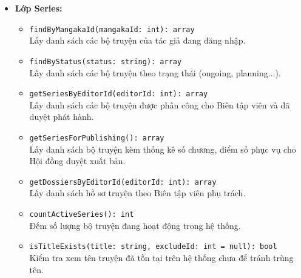 \begin{itemize}
    \item \textbf{Lớp Series:}
    \begin{itemize}
        \item \texttt{findByMangakaId(mangakaId: int): array}\\
            Lấy danh sách các bộ truyện của tác giả đang đăng nhập.
        \item \texttt{findByStatus(status: string): array}\\
            Lấy danh sách các bộ truyện theo trạng thái (ongoing, planning...).
        \item \texttt{getSeriesByEditorId(editorId: int): array}\\
            Lấy danh sách các bộ truyện được phân công cho Biên tập viên và đã duyệt phát hành.
        \item \texttt{getSeriesForPublishing(): array}\\
            Lấy danh sách bộ truyện kèm thống kê số chương, điểm số phục vụ cho Hội đồng duyệt xuất bản.
        \item \texttt{getDossiersByEditorId(editorId: int): array}\\
            Lấy danh sách hồ sơ truyện theo Biên tập viên phụ trách.
        \item \texttt{countActiveSeries(): int}\\
            Đếm số lượng bộ truyện đang hoạt động trong hệ thống.
        \item \texttt{isTitleExists(title: string, excludeId: int = null): bool}\\
            Kiểm tra xem tên truyện đã tồn tại trên hệ thống chưa để tránh trùng tên.
    \end{itemize}


\end{itemize}
